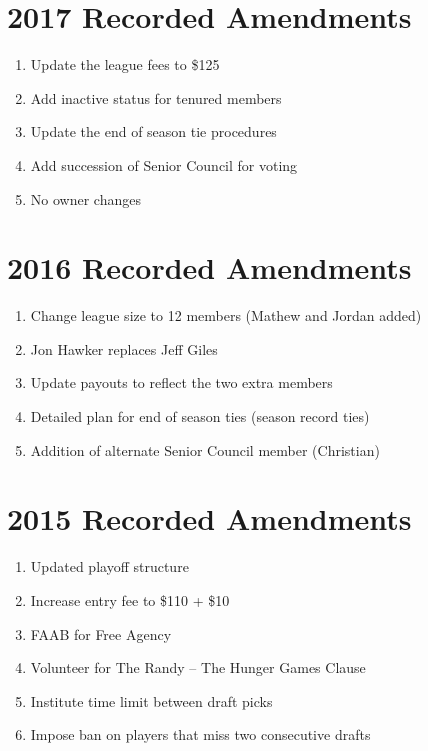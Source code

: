 \documentclass[
]{book}
\providecommand{\tightlist}{%
  \setlength{\itemsep}{0pt}\setlength{\parskip}{0pt}}
\begin{document}
\hypertarget{recorded-amendments-4}{%
\section{2017 Recorded Amendments}\label{recorded-amendments-4}}

\begin{enumerate}
\def\labelenumi{\arabic{enumi}.}
\tightlist
\item
  Update the league fees to \$125
\item
  Add inactive status for tenured members
\item
  Update the end of season tie procedures
\item
  Add succession of Senior Council for voting
\item
  No owner changes
\end{enumerate}

\hypertarget{recorded-amendments-5}{%
\section{2016 Recorded Amendments}\label{recorded-amendments-5}}

\begin{enumerate}
\def\labelenumi{\arabic{enumi}.}
\tightlist
\item
  Change league size to 12 members (Mathew and Jordan added)
\item
  Jon Hawker replaces Jeff Giles
\item
  Update payouts to reflect the two extra members
\item
  Detailed plan for end of season ties (season record ties)
\item
  Addition of alternate Senior Council member (Christian)
\end{enumerate}

\hypertarget{recorded-amendments-6}{%
\section{2015 Recorded Amendments}\label{recorded-amendments-6}}

\begin{enumerate}
\def\labelenumi{\arabic{enumi}.}
\tightlist
\item
  Updated playoff structure
\item
  Increase entry fee to \$110 + \$10
\item
  FAAB for Free Agency
\item
  Volunteer for The Randy -- The Hunger Games Clause
\item
  Institute time limit between draft picks
\item
  Impose ban on players that miss two consecutive drafts
\end{enumerate}
\end{document}
